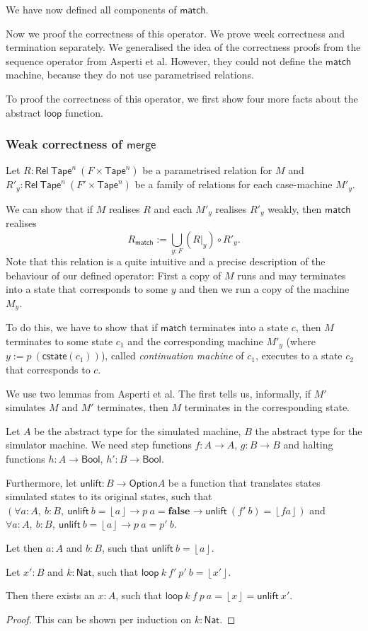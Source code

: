 \documentclass{psartcl}
\newcommand{\MS}[1]{\textsf{#1}}
\newcommand{\from}{:}
\renewcommand{\to}{\rightarrow}
\newcommand{\Option}{\MS{Option}}
\newcommand{\Bool}{\MS{Bool}}
\newcommand{\Nat}{\MS{Nat}}
\newcommand{\Some}[1]{\left\lfloor #1\right\rfloor}
\newcommand{\false}{\mathbf{false}}
\newcommand{\Rel}{\mathsf{Rel}}
\newcommand{\Tape}{\MS{Tape}}
\newcommand{\Tapes}[1]{\Tape^{#1}}
\newcommand{\at}[2][]{#1|_{#2}}
\begin{document}
We have now defined all components of $\MS{match}$.

Now we proof the correctness of this operator.  We prove week correctness and termination separately.
We generalised the idea of the correctness proofs from the sequence operator from Asperti et al.
However, they could not define the $\MS{match}$ machine, because they do not use parametrised relations.

To proof the correctness of this operator, we first show four more facts about the abstract $\MS{loop}$ function.

\subsubsection{Weak correctness of $\MS{merge}$}

Let $R:\Rel~{\Tapes{n}}~(F \times \Tapes{n})$ be a parametrised relation for $M$ and $R'_y:\Rel~\Tapes{n}~(F' \times \Tapes{n})$ be a family
of relations for each case-machine $M'_y$.

We can show that if $M$ realises $R$ and each $M'_y$ realises $R'_y$ weakly, then $\MS{match}$ realises
$$R_\MS{match} := \bigcup_{y:F} (R \at y) \circ R'_y.$$
Note that this relation is a quite intuitive and a precise description of the behaviour of our defined operator:  First a copy of $M$ runs and may
terminates into a state that corresponds to some $y$ and then we run a copy of the machine $M_y$.

To do this, we have to show that if $\MS{match}$ terminates into a state $c$, then $M$ terminates to some state $c_1$ and the corresponding machine
$M'_y$ (where $y := p~\left( \MS{cstate}(c_1) \right)$), called \emph{continuation machine} of $c_1$, executes to a state $c_2$ that corresponds to
$c$.

We use two lemmas from Asperti et al.  The first tells us, informally, if $M'$ simulates $M$ and $M'$ terminates, then $M$ terminates in the
corresponding state.

\begin{lemma}[Unlift $\MS{loop}$]
  \label{lem:loop-unlift}
  Let $A$ be the abstract type for the simulated machine, $B$ the abstract type for the simulator machine.
  We need step functions $f \from A \to A$, $g \from B \to B$ and halting functions $h \from A \to \Bool$, $h' \from B \to \Bool$.

  Furthermore, let $\MS{unlift} \from B \to \Option A$ be a function that translates states simulated states to its original states, such that
  $(\forall a: A,~b: B,~\MS{unlift}~b = \Some a \rightarrow p~a = \false \rightarrow \MS{unlift}~(f'~b) = \Some{f a})$
  and
  $\forall a: A,~b: B,~\MS{unlift}~b = \Some a \rightarrow p~a = p'~b$.

  Let then $a:A$ and $b:B$, such that $\MS{unlift}~b = \Some{a}$.

  Let $x':B$ and $k:\Nat$, such that $\MS{loop}~k~f'~p'~b = \Some{x'}$.

  Then there exists an $x:A$, such that $\MS{loop}~k~f~p~a = \Some x = \MS{unlift}~x'$.
\end{lemma}
\begin{proof}
  This can be shown per induction on $k:\Nat$.
\end{proof}
\end{document}
